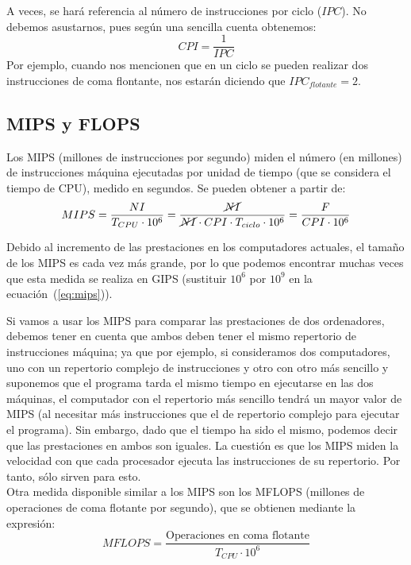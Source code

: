 A veces, se hará referencia al número de instrucciones por ciclo ($IPC$). No debemos asustarnos, pues según una sencilla cuenta obtenemos:
\begin{equation}
    CPI = \dfrac{1}{IPC}
\end{equation}
Por ejemplo, cuando nos mencionen que en un ciclo se pueden realizar dos instrucciones de coma flontante, nos estarán diciendo que $IPC_{flotante} = 2$.

\subsection{MIPS y FLOPS}
Los MIPS (millones de instrucciones por segundo) miden el número (en millones) de instrucciones máquina ejecutadas por unidad de tiempo (que se considera el tiempo de CPU), medido en segundos. Se pueden obtener a partir de:
\begin{equation} \label{eq:mips}
    MIPS = \dfrac{NI}{T_{CPU} \cdot 10^6} = \dfrac{\cancel{NI}}{\cancel{NI}\cdot CPI \cdot T_{ciclo} \cdot 10^6} = \dfrac{F}{CPI \cdot 10^6}
\end{equation}

Debido al incremento de las prestaciones en los computadores actuales, el tamaño de los MIPS es cada vez más grande, por lo que podemos encontrar muchas veces que esta medida se realiza en GIPS (sustituir $10^6$ por $10^9$ en la ecuación~(\ref{eq:mips})).

Si vamos a usar los MIPS para comparar las prestaciones de dos ordenadores, debemos tener en cuenta que ambos deben tener el mismo repertorio de instrucciones máquina; ya que por ejemplo, si consideramos dos computadores, uno con un repertorio complejo de instrucciones y otro con otro más sencillo y suponemos que el programa tarda el mismo tiempo en ejecutarse en las dos máquinas, el computador con el repertorio más sencillo tendrá un mayor valor de MIPS (al necesitar más instrucciones que el de repertorio complejo para ejecutar el programa). Sin embargo, dado que el tiempo ha sido el mismo, podemos decir que las prestaciones en ambos son iguales. La cuestión es que los MIPS miden la velocidad con que cada procesador ejecuta las instrucciones de su repertorio. Por tanto, sólo sirven para esto.\\

Otra medida disponible similar a los MIPS son los MFLOPS (millones de operaciones de coma flotante por segundo), que se obtienen mediante la expresión:
\begin{equation}
    MFLOPS = \dfrac{\text{Operaciones en coma flotante}}{T_{CPU} \cdot 10^6}
\end{equation}

